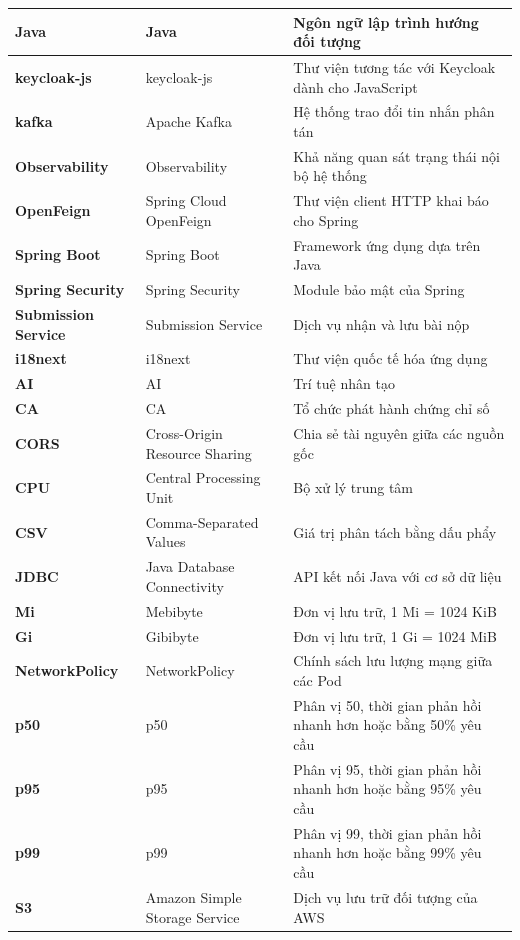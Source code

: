 \documentclass[../BTL.tex]{subfiles}
\begin{document}
\begin{longtable}{|p{3.2cm}|p{3.5cm}|p{7.1cm}|}
	\textbf{Java} & Java & Ngôn ngữ lập trình hướng đối tượng\\ \hline
	\textbf{keycloak-js} & keycloak-js & Thư viện tương tác với Keycloak dành cho JavaScript\\ \hline
	\textbf{kafka} & Apache Kafka & Hệ thống trao đổi tin nhắn phân tán\\ \hline
	\textbf{Ob\-serv\-ability} & Ob\-serv\-ability & Khả năng quan sát trạng thái nội bộ hệ thống\\ \hline
	\textbf{OpenFeign} & Spring Cloud OpenFeign & Thư viện client HTTP khai báo cho Spring\\ \hline
	\textbf{Spring Boot} & Spring Boot & Framework ứng dụng dựa trên Java\\ \hline
	\textbf{Spring Security} & Spring Security & Module bảo mật của Spring\\ \hline
	\textbf{Submission Service} & Submission Service & Dịch vụ nhận và lưu bài nộp\\ \hline
	\textbf{i18next} & i18next & Thư viện quốc tế hóa ứng dụng\\ \hline
	\textbf{AI} & AI & Trí tuệ nhân tạo\\ \hline
	\textbf{CA} & CA & Tổ chức phát hành chứng chỉ số\\ \hline
	\textbf{CORS} & Cross-Origin Resource Sharing & Chia sẻ tài nguyên giữa các nguồn gốc\\ \hline
	\textbf{CPU} & Central Processing Unit & Bộ xử lý trung tâm\\ \hline
	\textbf{CSV} & Comma-Separated Values & Giá trị phân tách bằng dấu phẩy\\ \hline
	\textbf{JDBC} & Java Database Connectivity & API kết nối Java với cơ sở dữ liệu\\ \hline
	\textbf{Mi} & Mebibyte & Đơn vị lưu trữ, 1 Mi = 1024 KiB\\ \hline
	\textbf{Gi} & Gibibyte & Đơn vị lưu trữ, 1 Gi = 1024 MiB\\ \hline
	\textbf{NetworkPolicy} & NetworkPolicy & Chính sách lưu lượng mạng giữa các Pod\\ \hline
	\textbf{p50} & p50 & Phân vị 50, thời gian phản hồi nhanh hơn hoặc bằng 50\% yêu cầu\\ \hline
	\textbf{p95} & p95 & Phân vị 95, thời gian phản hồi nhanh hơn hoặc bằng 95\% yêu cầu\\ \hline
	\textbf{p99} & p99 & Phân vị 99, thời gian phản hồi nhanh hơn hoặc bằng 99\% yêu cầu\\ \hline
	\textbf{S3} & Amazon Simple Storage Service & Dịch vụ lưu trữ đối tượng của AWS\\ \hline

\end{longtable}
\end{document}
